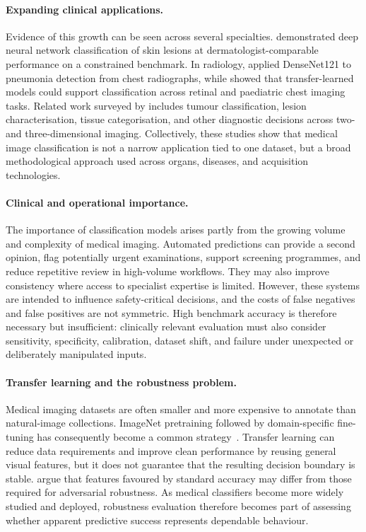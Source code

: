 \documentclass[12pt,a4paper,oneside]{report}
\begin{document}
\paragraph{Expanding clinical applications.}
Evidence of this growth can be seen across several specialties. \citet{esteva2017dermatologist} demonstrated deep neural network classification of skin lesions at dermatologist-comparable performance on a constrained benchmark. In radiology, \citet{rajpurkar2017chexnet} applied DenseNet121 to pneumonia detection from chest radiographs, while \citet{kermany2018identifying} showed that transfer-learned models could support classification across retinal and paediatric chest imaging tasks. Related work surveyed by \citet{litjens2017survey} includes tumour classification, lesion characterisation, tissue categorisation, and other diagnostic decisions across two- and three-dimensional imaging. Collectively, these studies show that medical image classification is not a narrow application tied to one dataset, but a broad methodological approach used across organs, diseases, and acquisition technologies.

\paragraph{Clinical and operational importance.}
The importance of classification models arises partly from the growing volume and complexity of medical imaging. Automated predictions can provide a second opinion, flag potentially urgent examinations, support screening programmes, and reduce repetitive review in high-volume workflows. They may also improve consistency where access to specialist expertise is limited. However, these systems are intended to influence safety-critical decisions, and the costs of false negatives and false positives are not symmetric. High benchmark accuracy is therefore necessary but insufficient: clinically relevant evaluation must also consider sensitivity, specificity, calibration, dataset shift, and failure under unexpected or deliberately manipulated inputs.

\paragraph{Transfer learning and the robustness problem.}
Medical imaging datasets are often smaller and more expensive to annotate than natural-image collections. ImageNet pretraining followed by domain-specific fine-tuning has consequently become a common strategy~\cite{deng2009imagenet,he2016deep}. Transfer learning can reduce data requirements and improve clean performance by reusing general visual features, but it does not guarantee that the resulting decision boundary is stable. \citet{tsipras2019robustness} argue that features favoured by standard accuracy may differ from those required for adversarial robustness. As medical classifiers become more widely studied and deployed, robustness evaluation therefore becomes part of assessing whether apparent predictive success represents dependable behaviour.
\end{document}
